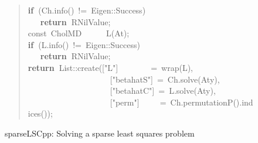 \documentclass[shortnames,article]{jss}
\newcommand{\hlstd}[1]{\textcolor[rgb]{0,0,0}{#1}}
\newcommand{\hlopt}[1]{\textcolor[rgb]{0,0,0}{#1}}
\newcommand{\hlstr}[1]{\textcolor[rgb]{0.90,0.15,0.15}{#1}}
\newcommand{\hlkwa}[1]{\textcolor[rgb]{0.61,0.13,0.93}{\bf{#1}}}
\newcommand{\hlkwb}[1]{\textcolor[rgb]{0.13,0.54,0.13}{#1}}
\newcommand{\hlkwd}[1]{\textcolor[rgb]{0,0,0}{#1}}
\begin{document}
\begin{figure}[htb]
\begin{quote}
    \hlstd{}\hlkwa{if\ }\hlstd{}\hlopt{(}\hlstd{Ch}\hlopt{.}\hlstd{}\hlkwd{info}\hlstd{}\hlopt{()\ !=\ }\hlstd{Eigen}\hlopt{::}\hlstd{Success}\hlopt{)}\hspace*{\fill}\\
    \hlstd{}\hlstd{\ \ \ }\hlstd{}\hlkwa{return\ }\hlstd{R\textunderscore NilValue}\hlopt{;}\hspace*{\fill}\\
    \hlstd{}\hlkwb{const\ }\hlstd{CholMD}\hlstd{\ \ \ \ \ \ }\hlstd{}\hlkwd{L}\hlstd{}\hlopt{(}\hlstd{At}\hlopt{);}\hspace*{\fill}\\
    \hlstd{}\hlkwa{if\ }\hlstd{}\hlopt{(}\hlstd{L}\hlopt{.}\hlstd{}\hlkwd{info}\hlstd{}\hlopt{()\ !=\ }\hlstd{Eigen}\hlopt{::}\hlstd{Success}\hlopt{)}\hspace*{\fill}\\
    \hlstd{}\hlstd{\ \ \ }\hlstd{}\hlkwa{return\ }\hlstd{R\textunderscore NilValue}\hlopt{;}\hspace*{\fill}\\
    \hlstd{}\hlkwa{return\ }\hlstd{List}\hlopt{::}\hlstd{}\hlkwd{create}\hlstd{}\hlopt{(}\hlstd{\textunderscore }\hlopt{{[}}\hlstd{}\hlstr{"L"}\hlstd{}\hlopt{{]}}\hlstd{\ \ \ \ \ \ \ \ }\hlopt{=\ }\hlstd{}\hlkwd{wrap}\hlstd{}\hlopt{(}\hlstd{L}\hlopt{),}\hspace*{\fill}\\
    \hlstd{}\hlstd{\ \ \ \ \ \ \ \ \ \ \ \ \ \ \ \ \ \ \ \ }\hlstd{\textunderscore }\hlopt{{[}}\hlstd{}\hlstr{"betahatS"}\hlstd{}\hlopt{{]}\ =\ }\hlstd{Ch}\hlopt{.}\hlstd{}\hlkwd{solve}\hlstd{}\hlopt{(}\hlstd{Aty}\hlopt{),}\hspace*{\fill}\\
    \hlstd{}\hlstd{\ \ \ \ \ \ \ \ \ \ \ \ \ \ \ \ \ \ \ \ }\hlstd{\textunderscore }\hlopt{{[}}\hlstd{}\hlstr{"betahatC"}\hlstd{}\hlopt{{]}\ =\ }\hlstd{L}\hlopt{.}\hlstd{}\hlkwd{solve}\hlstd{}\hlopt{(}\hlstd{Aty}\hlopt{),}\hspace*{\fill}\\
    \hlstd{}\hlstd{\ \ \ \ \ \ \ \ \ \ \ \ \ \ \ \ \ \ \ \ }\hlstd{\textunderscore }\hlopt{{[}}\hlstd{}\hlstr{"perm"}\hlstd{}\hlopt{{]}}\hlstd{\ \ \ \ \ }\hlopt{=\ }\hlstd{Ch}\hlopt{.}\hlstd{}\hlkwd{permutationP}\hlstd{}\hlopt{().}\hlstd{}\hlkwd{indices}\hlstd{}\hlopt{());}\hlstd{}\hspace*{\fill}\\
    \mbox{}
    \normalfont
    \normalsize
  \end{quote}
  \caption{sparseLSCpp: Solving a sparse least squares problem}
  \label{fig:spLS}
\end{figure}
\end{document}
